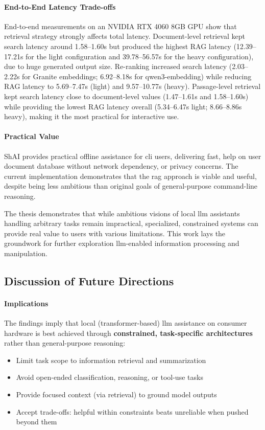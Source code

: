\paragraph{End-to-End Latency Trade-offs}
End-to-end measurements on an NVIDIA RTX 4060 8GB GPU show that retrieval
strategy strongly affects total latency. Document-level retrieval kept search
latency around 1.58--1.60s but produced the highest RAG latency (12.39--17.21s
for the light configuration and 39.78--56.57s for the heavy configuration), due
to huge generated output size.
Re-ranking increased search latency (2.03--2.22s for Granite embeddings;
6.92--8.18s for qwen3-embedding) while reducing RAG latency to 5.69--7.47s
(light) and 9.57--10.77s (heavy). Passage-level retrieval kept search latency
close to document-level values (1.47--1.61s and 1.58--1.60s) while providing the
lowest RAG latency overall (5.34--6.47s light; 8.66--8.86s heavy), making it the
most practical for interactive use.

\paragraph{Practical Value}
ShAI provides practical offline assistance for \gls{cli} users, delivering fast,
help on user document database without network dependency, or privacy concerns.
The current implementation demonstrates that the \gls{rag} approach is viable
and useful, despite being less ambitious than original goals of general-purpose
command-line reasoning.

The thesis demonstrates that while ambitious visions of local \gls{llm}
assistants handling arbitrary tasks remain impractical, specialized, constrained
systems can provide real value to users with various limitations. This work lays
the groundwork for further exploration \gls{llm}-enabled information processing
and manipulation.


\subsection{Discussion of Future Directions}

\paragraph{Implications}
The findings imply that local (transformer-based) \gls{llm} assistance on
consumer hardware is best achieved through \textbf{constrained, task-specific
architectures} rather than general-purpose reasoning:
\begin{itemize}
  \item Limit task scope to information retrieval and summarization
  \item Avoid open-ended classification, reasoning, or tool-use tasks
  \item Provide focused context (via retrieval) to ground model outputs
  \item Accept trade-offs: helpful within constraints beats unreliable when
      pushed beyond them
\end{itemize}

